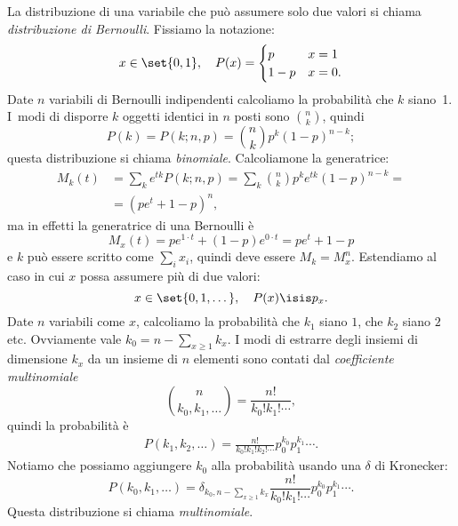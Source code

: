 La distribuzione di una variabile che può assumere solo due valori si chiama \emph{distribuzione di Bernoulli}.
Fissiamo la notazione:
\begin{equation*}
	x \in \set{0,1}, \quad P(x) = \begin{cases}
		p & x = 1 \\
		1-p & x = 0.
	\end{cases}
\end{equation*}
Date $n$ variabili di Bernoulli indipendenti calcoliamo la probabilità che $k$ siano~1.
I~modi di disporre $k$ oggetti identici in $n$ posti sono $\binom nk$, quindi
\begin{equation*}
	P(k) = P(k;n,p) = \binom nk p^{k} (1-p)^{n-k};
\end{equation*}
questa distribuzione si chiama \emph{binomiale}.
Calcoliamone la generatrice:
\begin{align*}
	M_k(t) &=
	\sum_k e^{tk} P(k;n,p) =
	\sum_k \binom nk p^k e^{tk} (1-p)^{n-k} = \\
	&= (pe^t + 1-p)^n,
\end{align*}
ma in effetti la generatrice di una Bernoulli è
\begin{equation*}
	M_x(t) = pe^{1\cdot t} + (1-p)e^{0\cdot t} = pe^t + 1-p
\end{equation*}
e $k$ può essere scritto come $\sum_ix_i$, quindi deve essere $M_k = M_x^n$.
Estendiamo al caso in cui $x$ possa assumere più di due valori:
\begin{equation*}
	x \in \set{0,1,\dotsc}, \quad P(x) \isis p_x.
\end{equation*}
Date $n$ variabili come $x$,
calcoliamo la probabilità che $k_1$ siano $1$, che $k_2$ siano $2$ etc.
Ovviamente vale $k_0=n - \sum_{x\ge 1} k_x$.
I modi di estrarre degli insiemi di dimensione $k_x$ da un insieme di $n$ elementi sono contati dal \emph{coefficiente multinomiale}
\begin{equation*}
	\binom{n}{k_0,k_1,\dotsc} = \frac{n!}{k_0!k_1!\dotsm},
\end{equation*}
quindi la probabilità è
\begin{align*}
	P(k_1,k_2,\dotsc) = \frac{n!}{k_0!k_1!k_2!\dotsm} p_0^{k_0} p_1^{k_1} \dotsm.
\end{align*}
Notiamo che possiamo aggiungere $k_0$ alla probabilità usando una $\delta$ di Kronecker:
\begin{equation*}
	P(k_0,k_1,\dotsc) = \delta_{k_0,n-\sum_{x\ge 1}k_x} \frac{n!}{k_0!k_1!\dotsm} p_0^{k_0} p_1^{k_1} \dotsm.
\end{equation*}
Questa distribuzione si chiama \emph{multinomiale}.

